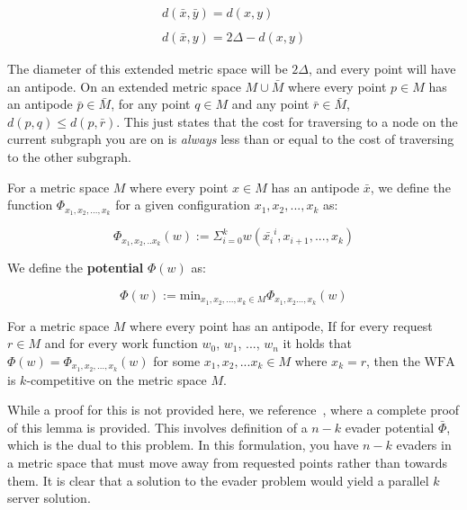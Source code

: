 \begin{equation*}
    \begin{gathered}
        d(\bar{x}, \bar{y}) = d(x,y)\\ \\
        d(\bar{x}, y) = 2\Delta - d(x,y)
    \end{gathered}
\end{equation*}

The diameter of this extended metric space will be $2\Delta$, and every point will have an antipode. On an extended metric space $M \cup \bar{M}$ where every point $p \in M$ has an antipode $\bar{p} \in \bar{M}$, for any point $q \in M$ and any point $\bar{r} \in \bar{M}$, $d(p,q) \leq d(p,\bar{r})$. This just states that the cost for traversing to a node on the current subgraph you are on is \textit{always} less than or equal to the cost of traversing to the other subgraph.

\begin{definition}
    For a metric space $M$ where every point $x \in M$ has an antipode $\bar{x}$, we define the function \textbf{$\Phi_{x_1, x_2, ..., x_k}$} for a given configuration $x_1, x_2, ..., x_k$ as:

    \begin{equation*}
        \Phi_{x_1, x_2, ..x_k}(w) := \Sigma_{i=0}^k w(\bar{x_i}^i, x_{i+1}, ..., x_k)
    \end{equation*}
\end{definition}

\begin{definition}
    We define the \textbf{potential} $\Phi (w)$ as:

    \begin{equation*}
        \Phi(w) := \mathrm{min}_{x_1, x_2, ..., x_k \in M} \Phi_{x_1, x_2..., x_k} (w)
    \end{equation*}
\end{definition}

\begin{lemma}
    For a metric space $M$ where every point has an antipode, If for every request $r \in M$ and for every work function $w_0$, $w_1$, ..., $w_n$ it holds that $\Phi(w) = \Phi_{x_1, x_2, ..., x_k}(w)$ for some $x_1, x_2, ...x_k \in M$ where $x_k = r$, then the $\mathrm{WFA}$ is $k$-competitive on the metric space $M$.
\end{lemma}

While a proof for this is not provided here, we reference~\cite{unifyingPotential2021}, where a complete proof of this lemma is provided. This involves definition of a $n-k$ evader potential $\bar{\Phi}$, which is the dual to this problem. In this formulation, you have $n-k$ evaders in a metric space that must move away from requested points rather than towards them. It is clear that a solution to the evader problem would yield a parallel $k$ server solution.